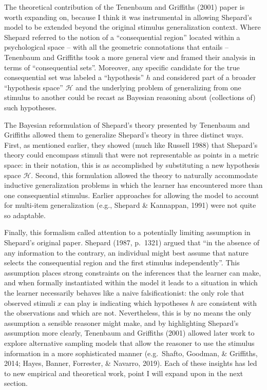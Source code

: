 \documentclass[
  english,
  doc]{apa6}
\begin{document}
The theoretical contribution of the Tenenbaum and Griffiths (2001) paper is worth expanding on, because I think it was instrumental in allowing Shepard's model to be extended beyond the original stimulus generalization context. Where Shepard referred to the notion of a \enquote{consequential region} located within a psychological space -- with all the geometric connotations that entails -- Tenenbaum and Griffiths took a more general view and framed their analysis in terms of \enquote{consequential sets}. Moreover, any specific candidate for the true consequential set was labeled a \enquote{hypothesis} \(h\) and considered part of a broader \enquote{hypothesis space} \(\mathcal{H}\) and the underlying problem of generalizing from one stimulus to another could be recast as Bayesian reasoning about (collections of) such hypotheses.

The Bayesian reformulation of Shepard's theory presented by Tenenbaum and Griffiths allowed them to generalize Shepard's theory in three distinct ways. First, as mentioned earlier, they showed (much like Russell 1988) that Shepard's theory could encompass stimuli that were not representable as points in a metric space: in their notation, this is as accomplished by substituting a new hypothesis space \(\mathcal{H}\). Second, this formulation allowed the theory to naturally accommodate inductive generalization problems in which the learner has encountered more than one consequential stimulus. Earlier approaches for allowing the model to account for multi-item generalization (e.g., Shepard \& Kannappan, 1991) were not quite so adaptable.

Finally, this formalism called attention to a potentially limiting assumption in Shepard's original paper. Shepard (1987, p.~1321) argued that \enquote{in the absence of any information to the contrary, an individual might best assume that nature selects the consequential region and the first stimulus independently}. This assumption places strong constraints on the inferences that the learner can make, and when formally instantiated within the model it leads to a situation in which the learner necessarily behaves like a naive falsificationist: the only role that observed stimuli \(x\) can play is indicating which hypotheses \(h\) are consistent with the observations and which are not. Nevertheless, this is by no means the only assumption a sensible reasoner might make, and by highlighting Shepard's assumption more clearly, Tenenbaum and Griffiths (2001) allowed later work to explore alternative sampling models that allow the reasoner to use the stimulus information in a more sophisticated manner (e.g.~Shafto, Goodman, \& Griffiths, 2014; Hayes, Banner, Forrester, \& Navarro, 2019). Each of these insights has led to new empirical and theoretical work, point I will expand upon in the next section.
\end{document}
